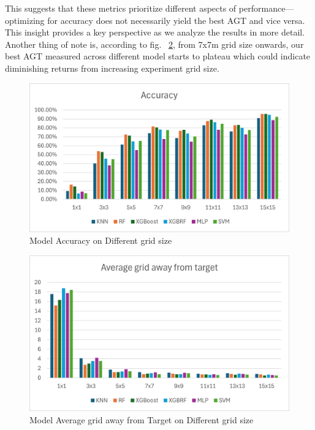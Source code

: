\documentclass[conference]{IEEEtran}
\begin{document}
	
	
	This suggests that these metrics prioritize different aspects of performance—optimizing for accuracy does not necessarily yield the best AGT and vice versa. This insight provides a key perspective as we analyze the results in more detail. Another thing of note is, according to fig. ~\ref{fig:AGT_dgrid_size}, from 7x7m grid size onwards, our best AGT measured across different model starts to plateau which could indicate diminishing returns from increasing experiment grid size.
	
	\begin{figure}[htbp]
		\centerline{\includegraphics[scale=0.65]{image3.png}}
		\caption{Model Accuracy on Different grid size}
		\label{fig:acc_dgird_size}
	\end{figure}
	
	\begin{figure}[htbp]
		\centerline{\includegraphics[scale=0.65]{image1.png}}
		\caption{Model Average grid away from Target on Different grid size}
		\label{fig:AGT_dgrid_size}
	\end{figure}
	
\end{document}
